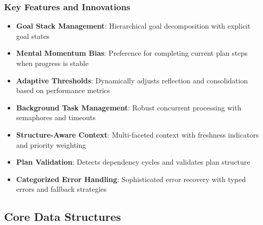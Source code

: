 \documentclass[12pt,a4paper]{article}
\begin{document}
\subsubsection*{Key Features and Innovations}

\begin{itemize}
    \item \textbf{Goal Stack Management}: Hierarchical goal decomposition with explicit goal states
    \item \textbf{Mental Momentum Bias}: Preference for completing current plan steps when progress is stable
    \item \textbf{Adaptive Thresholds}: Dynamically adjusts reflection and consolidation based on performance metrics
    \item \textbf{Background Task Management}: Robust concurrent processing with semaphores and timeouts
    \item \textbf{Structure-Aware Context}: Multi-faceted context with freshness indicators and priority weighting
    \item \textbf{Plan Validation}: Detects dependency cycles and validates plan structure
    \item \textbf{Categorized Error Handling}: Sophisticated error recovery with typed errors and fallback strategies
\end{itemize}

\subsection*{Core Data Structures}
\end{document}
